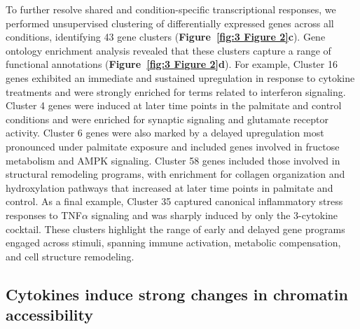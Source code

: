 To further resolve shared and condition-specific transcriptional responses, we performed unsupervised clustering of differentially expressed genes across all conditions, identifying 43 gene clusters (\textbf{Figure~\ref{fig:3 Figure 2}\textbf{c}}). Gene ontology enrichment analysis revealed that these clusters capture a range of functional annotations (\textbf{Figure~\ref{fig:3 Figure 2}\textbf{d}}). For example, Cluster 16 genes exhibited an immediate and sustained upregulation in response to cytokine treatments and were strongly enriched for terms related to interferon signaling. Cluster 4 genes were induced at later time points in the palmitate and control conditions and were enriched for synaptic signaling and glutamate receptor activity. Cluster 6 genes were also marked by a delayed upregulation most pronounced under palmitate exposure and included genes involved in fructose metabolism and AMPK signaling. Cluster 58 genes included those involved in structural remodeling programs, with enrichment for collagen organization and hydroxylation pathways that increased at later time points in palmitate and control. As a final example, Cluster 35 captured canonical inflammatory stress responses to TNF$\alpha$ signaling and was sharply induced by only the 3-cytokine cocktail. These clusters highlight the range of early and delayed gene programs engaged across stimuli, spanning immune activation, metabolic compensation, and cell structure remodeling.

\subsection{Cytokines induce strong changes in chromatin accessibility}

